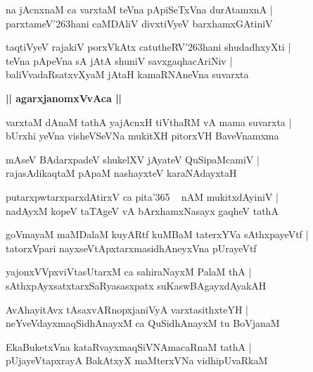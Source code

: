 \documentclass[twoside,12pt,openright]{book}
\def\S{\char'263}
\newcounter{shloka}[chapter]
\def\uvaca#1{\centerline{{\large\textbf{#1}}}}
\begin{document}
\begin{shloka}%
na jAcnxnaM ca varxtaM teVna pApiSeTxVna durAtamxnA |\\
parxtameV\S hani caMDAliV divxtiVyeV barxhamxGAtiniV 
\end{shloka}

\begin{shloka}%
taqtiVyeV rajakiV porxVkAtx catutheRV\S hani shudadhxyXti |\\
teVna pApeVna sA jAtA shuniV savxgaqhacAriNiv |\\
baliVvadaRsatxvXyaM jAtaH kamaRNAneVna suvarxta
\end{shloka}

\uvaca{|| agarxjanomxVvAca ||}

\begin{shloka}%
varxtaM dAnaM tathA yajAcnxH tiVthaRM vA mama suvarxta |\\
bUrxhi yeVna visheVSeVNa mukitXH pitorxVH BaveVnamxma
\end{shloka}

\begin{shloka}%
mAseV BAdarxpadeV shukelXV jAyateV QuSipaMcamiV |\\
rajasAdikaqtaM pApaM  nashayxteV karaNAdayxtaH 
\end{shloka}

\begin{shloka}%
putarxpwtarxparxdAtirxV ca pita\char'365 ~ nAM mukitxdAyiniV |\\
nadAyxM kopeV taTAgeV vA bArxhamxNasayx gaqheV tathA 
\end{shloka}

\begin{shloka}%
goVmayaM maMDalaM kuyARtf kuMBaM taterxYVa sAthxpayeVtf |\\
tatorxVpari nayxseVtApxtarxmasidhAneyxVna pUrayeVtf 
\end{shloka}

\begin{shloka}%
yajonxVVpxviVtasUtarxM  ca sahiraNayxM PalaM thA |\\
sAthxpAyxsatxtarxSaRyasasxpatx suKaswBAgayxdAyakAH 
\end{shloka}

\begin{shloka}%
AvAhayitAvx tAsaxvARnopxjaniVyA varxtasithxteYH |\\
neYveVdayxmaqSidhAnayxM ca QuSidhAnayxM tu BoVjanaM 
\end{shloka}

\begin{shloka}%
EkaBuketxVna kataRvayxmaqSiVNAmacaRnaM tathA |\\
pUjayeVtapxrayA BakAtxyX maMterxVNa vidhipUvaRkaM 
\end{shloka}
\end{document}
